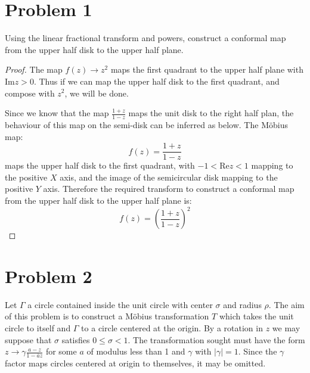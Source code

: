 \documentclass{article}[12pt]
\begin{document}
\section*{Problem 1}Using the linear fractional transform and powers,
construct a conformal map from the upper half disk to the upper
half plane.
\begin{proof}
The map $f(z)\to z^2$ maps the first quadrant to the upper half plane
with $\mbox{Im}z>0$. Thus if we can map the upper half disk to the
first quadrant, and compose with $z^2$, we will be done.

Since we know that the map $\frac{1+z}{1-z}$ maps the unit disk to the
right half plan, the behaviour of this map on the semi-disk can be
inferred as below.
The M\"obius map:
\[
f(z) = \frac{1+z}{1-z}
\]
maps the upper half disk to the first quadrant, with $-1<\mbox{Re}z<1$ mapping
to the positive $X$ axis, and the image of the semicircular disk
mapping to the positive $Y$ axis. Therefore the required transform
to construct a conformal map from the upper half disk to the upper
half plane is:
\[
f(z) = \left(\frac{1+z}{1-z}\right)^2
\]
\end{proof}

\section*{Problem 2}
Let $\Gamma$ a circle contained inside the unit circle with center
$\sigma$ and radius $\rho$. The aim of this problem is to construct
a M\"obius transformation $T$ which takes the unit circle to itself
and $\Gamma$ to a circle centered at the origin. By a rotation in $z$
we may suppose that $\sigma$ satisfies $0\le \sigma < 1$. The transformation
sought must have the form $z\to \gamma\frac{a-z}{1-\overline{a}z}$ for
some $a$ of modulus less than 1 and $\gamma$ with $|\gamma|=1$.
Since the $\gamma$ factor maps circles centered at origin to
themselves, it may be omitted.
\end{document}
